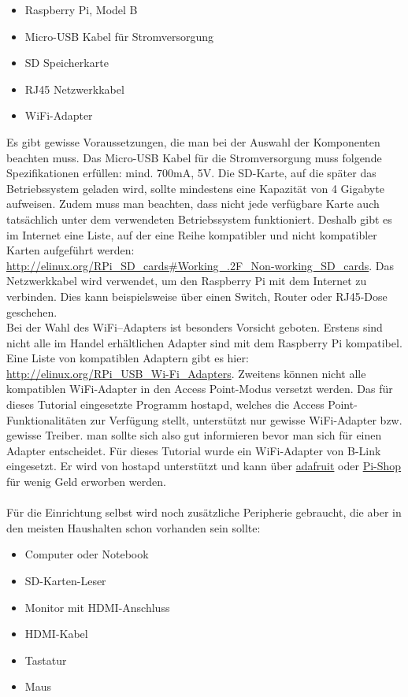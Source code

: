 \begin{itemize}
  \item Raspberry Pi, Model B
  \item Micro-USB Kabel für Stromversorgung
  \item SD Speicherkarte
  \item RJ45 Netzwerkkabel
  \item WiFi-Adapter
\end{itemize}

Es gibt gewisse Voraussetzungen, die man bei der Auswahl der Komponenten beachten muss. Das Micro-USB Kabel für die Stromversorgung muss folgende Spezifikationen erfüllen: mind. 700mA, 5V. Die SD-Karte, auf die später das Betriebssystem geladen wird, sollte mindestens eine Kapazität von 4 Gigabyte aufweisen. Zudem muss man beachten, dass nicht jede verfügbare Karte auch tatsächlich unter dem verwendeten Betriebssystem funktioniert. Deshalb gibt es im Internet eine Liste, auf der eine Reihe kompatibler und nicht kompatibler Karten aufgeführt werden: \url{http://elinux.org/RPi\_SD\_cards\#Working\_.2F\_Non-working\_SD\_cards}.
Das Netzwerkkabel wird verwendet, um den Raspberry Pi mit dem Internet zu verbinden. Dies kann beispielsweise über einen Switch, Router oder RJ45-Dose geschehen.
\\
Bei der Wahl des WiFi--Adapters ist besonders Vorsicht geboten. Erstens sind nicht alle im Handel erhältlichen Adapter sind mit dem Raspberry Pi kompatibel. Eine Liste von kompatiblen Adaptern gibt es hier: \url{http://elinux.org/RPi_USB_Wi-Fi_Adapters}.
Zweitens können nicht alle kompatiblen WiFi-Adapter in den Access Point-Modus versetzt werden. Das für dieses Tutorial eingesetzte Programm hostapd, welches die Access Point-Funktionalitäten zur Verfügung stellt, unterstützt nur gewisse WiFi-Adapter bzw. gewisse Treiber. man sollte sich also gut informieren bevor man sich für einen Adapter entscheidet. 
Für dieses Tutorial wurde ein WiFi-Adapter von B-Link eingesetzt. Er wird von hostapd unterstützt und kann über \href{http://www.adafruit.com/products/1030}{adafruit} oder \href{http://www.pi-shop.ch/usb-wifi-802-11b-g-n-module-mit-antenne-fuer-raspberry-pi}{Pi-Shop} für wenig Geld erworben werden.
\\
\\
Für die Einrichtung selbst wird noch zusätzliche Peripherie gebraucht, die aber in den meisten Haushalten schon vorhanden sein sollte:

\begin{itemize}
  \item Computer oder Notebook
  \item SD-Karten-Leser
  \item Monitor mit HDMI-Anschluss
  \item HDMI-Kabel
  \item Tastatur
  \item Maus
\end{itemize}

